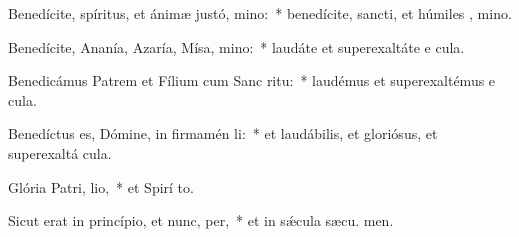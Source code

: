 \item Benedícite, spíritus, et ánimæ justó, mino:~* benedícite, sancti, et húmiles , mino.
\item Benedícite, Ananía, Azaría, Mísa, mino:~* laudáte et superexaltáte e  cula.
\item Benedicámus Patrem et Fílium cum Sanc ritu:~* laudémus et superexaltémus e  cula.
\item Benedíctus es, Dómine, in firmamén li:~* et laudábilis, et gloriósus, et superexaltá  cula.
\item Glória Patri,  lio,~* et Spirí to.
\item Sicut erat in princípio, et nunc,  per,~* et in sǽcula sæcu. men.
